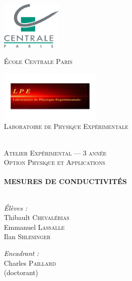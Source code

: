 
\begin{titlepage}

\begin{center}

\begin{minipage}[t]{0.48\textwidth}
  \begin{flushleft}
    \includegraphics [width=30mm]{images/ecp.jpg} \\[0.5cm]
    \begin{spacing}{1.5}
      \textsc{\'Ecole Centrale Paris}
    \end{spacing}
  \end{flushleft}
\end{minipage}
\begin{minipage}[t]{0.48\textwidth}
  \begin{flushright}
    \includegraphics [width=50mm]{images/lpe.png} \\[0.5cm]
    \textsc{Laboratoire de Physique Expérimentale}
  \end{flushright}
\end{minipage} \\[3cm]

\textsc{\Large Atelier Expérimental --- 3\ieme{} année \\Option Physique
et Applications}\\[0.5cm]
\HRule \\[0.4cm]
{\huge \bfseries MESURES DE CONDUCTIVIT\'ES}\\[0.4cm]
\HRule \\[1.3cm]

\begin{minipage}[t]{0.3\textwidth}
  \begin{flushleft} 
    \emph{\'Elèves :}\\
    Thibault \textsc{Chevalérias}\\
    Emmanuel \textsc{Lassalle}\\
    Ilan \textsc{Shlesinger}\\
  \end{flushleft}
\end{minipage}
\begin{minipage}[t]{0.6\textwidth}
  \begin{flushright} 
    \emph{Encadrant :} \\
    Charles \textsc{Paillard} \\(doctorant)\\
  \end{flushright}
\end{minipage}


\end{center}
\end{titlepage}
